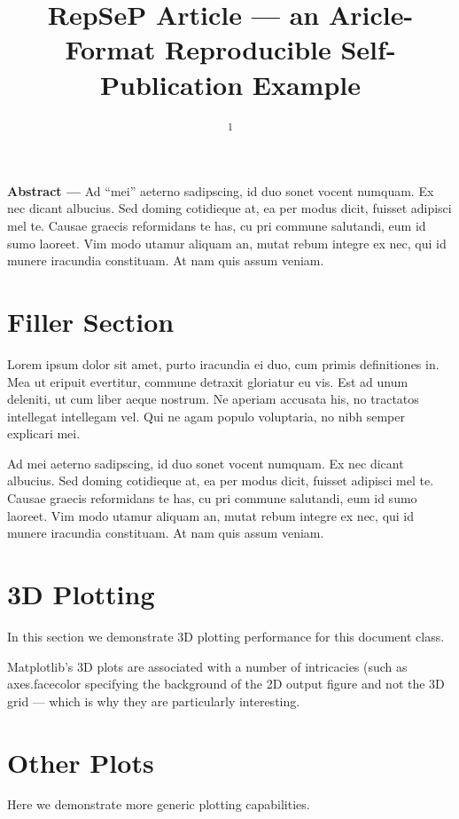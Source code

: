 \documentclass[10pt,a4paper,twocolumn,german]{article}
\title{RepSeP Article --- an Aricle-Format Reproducible Self-Publication Example}
\author{
	\authorstyle{Horea-Ioan Ioanas\textsuperscript{1}}
	\newline
	\textsuperscript{1}\institution{Institute for Biomedical Engineering, ETH and University of Zurich}
}
\date{}
\begin{document}
\maketitle
\thispagestyle{firstpage}
\noindent
\textsf{%
\textbf{Abstract ---}
Ad “mei” aeterno sadipscing, id duo sonet vocent numquam.
Ex nec dicant albucius. Sed doming cotidieque at, ea per modus dicit, fuisset adipisci mel te.
Causae graecis reformidans te has, cu pri commune salutandi, eum id sumo laoreet.
Vim modo utamur aliquam an, mutat rebum integre ex nec, qui id munere iracundia constituam.
At nam quis assum veniam.	
}

\section{Filler Section}

	Lorem ipsum dolor sit amet, purto iracundia ei duo, cum primis definitiones in.
	Mea ut eripuit evertitur, commune detraxit gloriatur eu vis.
	Est ad unum deleniti, ut cum liber aeque nostrum.
	Ne aperiam accusata his, no tractatos intellegat intellegam vel.
	Qui ne agam populo voluptaria, no nibh semper explicari mei.
	
	Ad mei aeterno sadipscing, id duo sonet vocent numquam.
	Ex nec dicant albucius. Sed doming cotidieque at, ea per modus dicit, fuisset adipisci mel te.
	Causae graecis reformidans te has, cu pri commune salutandi, eum id sumo laoreet.
	Vim modo utamur aliquam an, mutat rebum integre ex nec, qui id munere iracundia constituam.
	At nam quis assum veniam.	

\section{3D Plotting}
	In this section we demonstrate 3D plotting performance for this document class.

	Matplotlib's 3D plots are associated with a number of intricacies (such as axes.facecolor specifying the background of the 2D output figure and not the 3D grid --- which is why they are particularly interesting. 
	

\section{Other Plots}
	Here we demonstrate more generic plotting capabilities.
\end{document}
